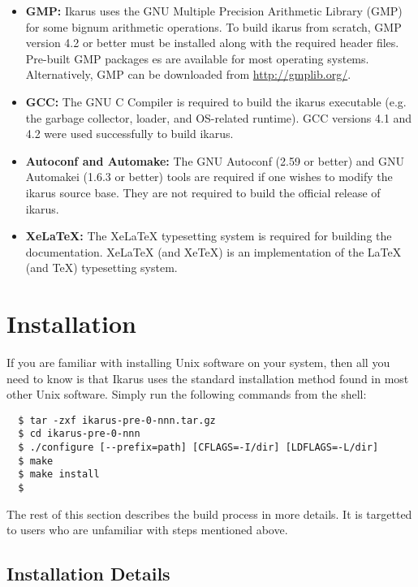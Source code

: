\documentclass[onecolumn, 12pt, twoside, openright, dvipdfm]{book}
\begin{document}
\begin{itemize}
\item\textbf{GMP:} Ikarus uses the GNU Multiple Precision Arithmetic
Library (GMP) for some bignum arithmetic operations.  To build
ikarus from scratch, GMP version 4.2 or better must be installed
along with the required header files.  Pre-built GMP packages es are
available for most operating systems.  Alternatively, GMP can be
downloaded from \url{http://gmplib.org/}.

\item\textbf{GCC:} The GNU C Compiler is required to build the ikarus
executable (e.g. the garbage collector, loader, and OS-related
runtime).  GCC versions 4.1 and 4.2 were used successfully to build
ikarus.

\item\textbf{Autoconf and Automake:} The GNU Autoconf (2.59 or better)
and GNU Automakei (1.6.3 or better) tools are required if one
wishes to modify the ikarus source base.  They are not
required to build the official release of ikarus.

\item\textbf{XeLaTeX:}  The XeLaTeX typesetting system is required
for building the documentation.  XeLaTeX (and XeTeX) is an
implementation of the LaTeX (and TeX) typesetting system.

\end{itemize}

\newpage

\section{Installation}

If you are familiar with installing Unix software on your system,
then all you need to know is that Ikarus uses the standard
installation method found in most other Unix software.  Simply run
the following commands from the shell:
\begin{verbatim}
  $ tar -zxf ikarus-pre-0-nnn.tar.gz
  $ cd ikarus-pre-0-nnn
  $ ./configure [--prefix=path] [CFLAGS=-I/dir] [LDFLAGS=-L/dir]
  $ make
  $ make install
  $
\end{verbatim}

The rest of this section describes the build process in more
details.  It is targetted to users who are unfamiliar with steps
mentioned above.

\subsection{Installation Details}
\end{document}
